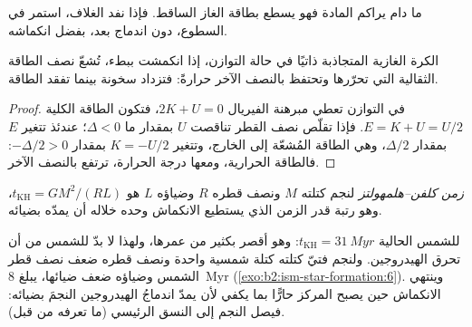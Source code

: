 \begin{omfigure}
\par{}
\end{omfigure}

ما دام  يراكم المادة فهو يسطع بطاقة الغاز الساقط. فإذا
نفد الغلاف، استمر في السطوع، دون اندماج بعد، بفضل
انكماشه.

\begin{proposition}
\label{prop:b2:ism-star-formation:contraction}
الكرة الغازية المتجاذبة ذاتيًا في حالة التوازن، إذا انكمشت ببطء، تُشعّ
نصف الطاقة الثقالية التي تحرّرها وتحتفظ بالنصف الآخر حرارةً:
فتزداد سخونة بينما تفقد الطاقة.
\end{proposition}

\begin{proof}
في التوازن تعطي مبرهنة الفيريال $2K + U = 0$، فتكون الطاقة الكلية
$E = K + U = U/2$. فإذا تقلّص نصف القطر تناقصت $U$ بمقدار ما
$\Delta < 0$؛ عندئذ تتغير $E$ بمقدار $\Delta/2$، وهي الطاقة المُشعّة
إلى الخارج، وتتغير $K = -U/2$ بمقدار $-\Delta/2 > 0$: فالطاقة الحرارية، ومعها
درجة الحرارة، ترتفع بالنصف الآخر.
\end{proof}

\begin{definition}\label{def:b2:ism-star-formation:kh-time}
\emph{زمن كلفن--هلمهولتز}
لنجم كتلته $M$ ونصف قطره $R$ وضياؤه $L$ هو
$t_{\mathrm{KH}} = GM^2/(RL)$، وهو رتبة قدر الزمن الذي يستطيع
الانكماش وحده خلاله أن يمدّه بضيائه.
\end{definition}

للشمس الحالية $t_{\mathrm{KH}} = \qty{31}{Myr}$: وهو أقصر بكثير من
عمرها، ولهذا لا بدّ للشمس من أن تحرق الهيدروجين. ولنجم فتيّ كتلته كتلة
شمسية واحدة ونصف قطره ضعف نصف قطر الشمس وضياؤه ضعف ضيائها، يبلغ \qty{8}{Myr}
(\cref{exo:b2:ism-star-formation:6}). وينتهي الانكماش حين يصبح المركز حارًّا بما يكفي لأن يمدّ اندماجُ الهيدروجين
النجمَ بضيائه: فيصل النجم إلى النسق الرئيسي (ما تعرفه من قبل).

